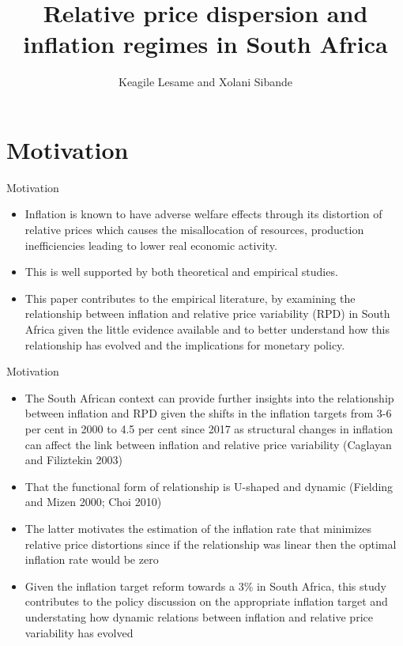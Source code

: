 \documentclass[
  ignorenonframetext,
]{beamer}
\title{Relative price dispersion and inflation regimes in South Africa}
\author{Keagile Lesame and Xolani Sibande}
\date{}
\providecommand{\tightlist}{%
  \setlength{\itemsep}{0pt}\setlength{\parskip}{0pt}}\usepackage{longtable,booktabs,array}
\begin{document}
\frame{\titlepage}

\section{Motivation}\label{motivation}

\begin{frame}{Motivation}
\label{motivation-1}
\begin{itemize}
\tightlist
\item
  Inflation is known to have adverse welfare effects through its
  distortion of relative prices which causes the misallocation of
  resources, production inefficiencies leading to lower real economic
  activity.
\item
  This is well supported by both theoretical and empirical studies.
\item
  This paper contributes to the empirical literature, by examining the
  relationship between inflation and relative price variability (RPD) in
  South Africa given the little evidence available and to better
  understand how this relationship has evolved and the implications for
  monetary policy.
\end{itemize}
\end{frame}

\begin{frame}{Motivation}
\label{motivation-2}
\begin{itemize}
\tightlist
\item
  The South African context can provide further insights into the
  relationship between inflation and RPD given the shifts in the
  inflation targets from 3-6 per cent in 2000 to 4.5 per cent since 2017
  as structural changes in inflation can affect the link between
  inflation and relative price variability (Caglayan and Filiztekin
  2003)
\item
  That the functional form of relationship is U-shaped and dynamic
  (Fielding and Mizen 2000; Choi 2010)
\item
  The latter motivates the estimation of the inflation rate that
  minimizes relative price distortions since if the relationship was
  linear then the optimal inflation rate would be zero
\item
  Given the inflation target reform towards a 3\% in South Africa, this
  study contributes to the policy discussion on the appropriate
  inflation target and understating how dynamic relations between
  inflation and relative price variability has evolved
\end{itemize}
\end{frame}
\end{document}

